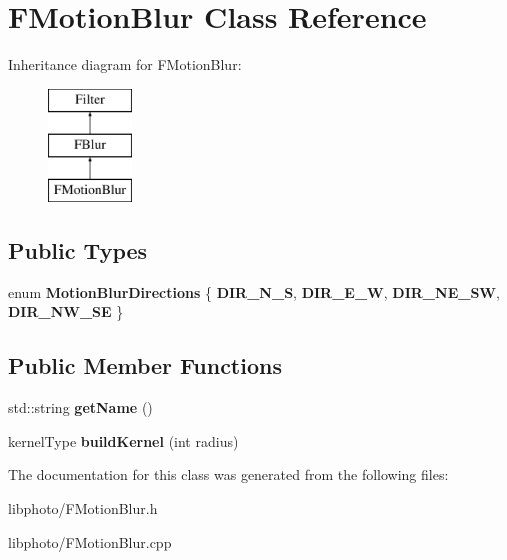 \hypertarget{classFMotionBlur}{\section{F\-Motion\-Blur Class Reference}
\label{classFMotionBlur}
}
Inheritance diagram for F\-Motion\-Blur\-:\begin{figure}[H]
\begin{center}
\leavevmode
\includegraphics[height=3.000000cm]{classFMotionBlur}
\end{center}
\end{figure}
\subsection*{Public Types}
\begin{DoxyCompactItemize}
\item 
enum {\bfseries Motion\-Blur\-Directions} \{ {\bfseries D\-I\-R\-\_\-\-N\-\_\-\-S}, 
{\bfseries D\-I\-R\-\_\-\-E\-\_\-\-W}, 
{\bfseries D\-I\-R\-\_\-\-N\-E\-\_\-\-S\-W}, 
{\bfseries D\-I\-R\-\_\-\-N\-W\-\_\-\-S\-E}
 \}
\end{DoxyCompactItemize}
\subsection*{Public Member Functions}
\begin{DoxyCompactItemize}
\item 
\hypertarget{classFMotionBlur_aeb40f52478dcf27d5fa8fec4aa473975}{std\-::string {\bfseries get\-Name} ()}\label{classFMotionBlur_aeb40f52478dcf27d5fa8fec4aa473975}

\item 
\hypertarget{classFMotionBlur_a105abc618c4fe5ddd890ad2ff1836979}{kernel\-Type {\bfseries build\-Kernel} (int radius)}\label{classFMotionBlur_a105abc618c4fe5ddd890ad2ff1836979}

\end{DoxyCompactItemize}


The documentation for this class was generated from the following files\-:\begin{DoxyCompactItemize}
\item 
libphoto/F\-Motion\-Blur.\-h\item 
libphoto/F\-Motion\-Blur.\-cpp\end{DoxyCompactItemize}
